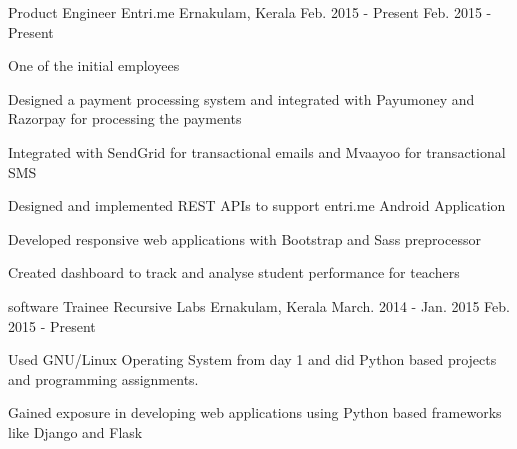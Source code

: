 

\begin{cvexperiences}

  \cvexperience
    {Product Engineer} %
    {Entri.me} %
    {Ernakulam, Kerala} %
    {Feb. 2015 - Present} %
    {Feb. 2015 - Present}
    {
      \begin{cvitems} %
        \item {One of the initial employees}
        \item {Designed a payment processing system and integrated with Payumoney and Razorpay for processing the payments}
        \item{Integrated with SendGrid for transactional emails and Mvaayoo for transactional SMS}
        \item{Designed and implemented REST APIs to support entri.me Android Application}
        \item{Developed responsive web applications with Bootstrap and Sass preprocessor}
        \item{Created dashboard to track and analyse student performance for teachers}
      \end{cvitems}
    }

  \cvexperience
    {software Trainee} %
    {Recursive Labs} %
    {Ernakulam, Kerala} %
    {March. 2014 - Jan. 2015} %
    {Feb. 2015 - Present}
    {
      \begin{cvitems} %
        \item {Used GNU/Linux Operating System from day 1 and did Python based projects and programming assignments.}
        \item {Gained exposure in developing web applications using Python based frameworks like Django and Flask}
      \end{cvitems}
    }

\end{cvexperiences}
